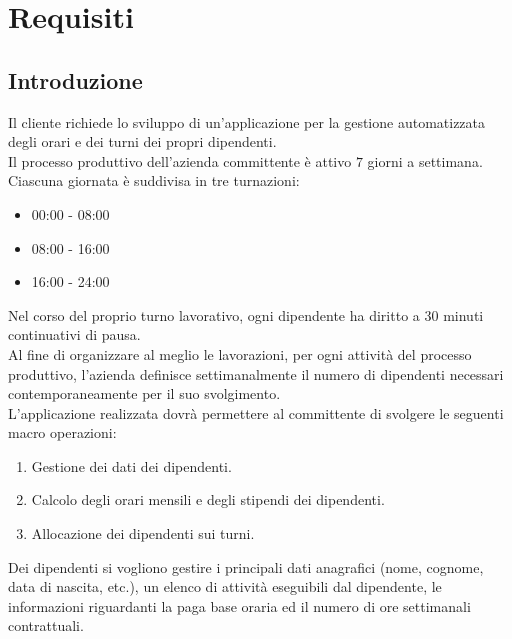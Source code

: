 \chapter{Requisiti}
\section{Introduzione}
Il cliente richiede lo sviluppo di un'applicazione per la gestione automatizzata degli orari e dei turni dei propri dipendenti.\\

\noindent
Il processo produttivo dell'azienda committente è attivo $7$ giorni a settimana. Ciascuna giornata è suddivisa in tre turnazioni:
\begin{itemize}
	\item 00:00 - 08:00
	\item 08:00 - 16:00
	\item 16:00 - 24:00
\end{itemize}
Nel corso del proprio turno lavorativo, ogni dipendente ha diritto a $30$ minuti continuativi di pausa.\\
Al fine di organizzare al meglio le lavorazioni, per ogni attività del processo produttivo, l'azienda definisce settimanalmente il numero di dipendenti necessari contemporaneamente per il suo svolgimento.\\

\noindent
L'applicazione realizzata dovrà permettere al committente di svolgere le seguenti macro operazioni:
\begin{enumerate}
	\item Gestione dei dati dei dipendenti.
	\item Calcolo degli orari mensili e degli stipendi dei dipendenti.
	\item Allocazione dei dipendenti sui turni.
\end{enumerate}
Dei dipendenti si vogliono gestire i principali dati anagrafici (nome, cognome, data di nascita, etc.), un elenco di attività eseguibili dal dipendente, le informazioni riguardanti la paga base oraria ed il numero di ore settimanali contrattuali.\\

